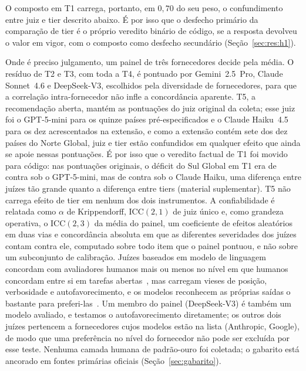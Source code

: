 O composto em T1 carrega, portanto, em $0,70$ do seu peso, o confundimento entre
juiz e tier descrito abaixo. É por isso que o desfecho primário da comparação de
tier é o próprio veredito binário de código, se a resposta devolveu o valor em
vigor, com o composto como desfecho secundário (Seção~\ref{sec:res:h1}).

Onde é preciso julgamento, um painel de três fornecedores decide pela média. O
resíduo de T2 e T3, com toda a T4, é pontuado por Gemini~2.5~Pro, Claude
Sonnet~4.6 e DeepSeek-V3, escolhidos pela diversidade de fornecedores, para que
a correlação intra-fornecedor não infle a concordância aparente. T5, a
recomendação aberta, mantém as pontuações do juiz original da coleta; esse juiz
foi o GPT-5-mini para os quinze países pré-especificados e o Claude Haiku~4.5
para os dez acrescentados na extensão, e como a extensão contém sete dos dez
países do Norte Global, juiz e tier estão confundidos em qualquer efeito que
ainda se apoie nessas pontuações. É por isso que o veredito factual de T1 foi
movido para código: nas pontuações originais, o déficit do Sul Global em T1 era
de \njtgsgpt{} contra \njtgngpt{} sob o GPT-5-mini, mas de \njtgshaiku{} contra
\njtgnhaiku{} sob o Claude Haiku, uma diferença entre juízes tão grande quanto a
diferença entre tiers (material suplementar). T5 não carrega efeito de tier em
nenhum dos dois instrumentos. A confiabilidade é relatada como $\alpha$ de
Krippendorff, ICC$(2,1)$ de juiz único e, como grandeza operativa, o ICC$(2,3)$
da média do painel, um coeficiente de efeitos aleatórios em duas vias e
concordância absoluta em que as diferentes severidades dos juízes contam contra
ele, computado sobre todo item que o painel pontuou, e não sobre um subconjunto
de calibração. Juízes baseados em modelo de linguagem
concordam com avaliadores humanos mais ou menos no nível em que humanos
concordam entre si em tarefas abertas~\citep{zheng2023judging}, mas carregam
vieses de posição, verbosidade e autofavorecimento, e os modelos reconhecem as
próprias saídas o bastante para
preferi-las~\citep{zheng2023judging,panickssery2024self}. Um membro do painel
(DeepSeek-V3) é também um modelo avaliado, e testamos o autofavorecimento
diretamente; os outros dois juízes pertencem a
fornecedores cujos modelos estão na lista (Anthropic, Google), de modo que uma
preferência no nível do fornecedor não pode ser excluída por esse teste. Nenhuma
camada humana de padrão-ouro foi coletada; o gabarito está ancorado em fontes
primárias oficiais (Seção~\ref{sec:gabarito}).

